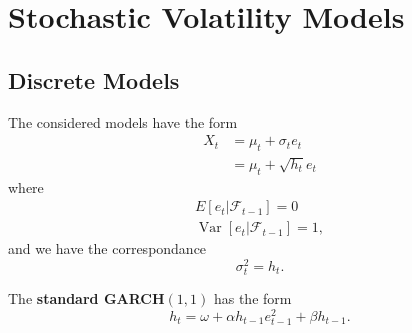 \documentclass[10pt]{article}
\newcommand{\filtr}{\mathscr{F}}
\DeclareMathOperator{\Var}{Var}
\begin{document}
\section{Stochastic Volatility Models}

\subsection{Discrete Models}
\begin{outline}
  \1 The considered models have the form
  \begin{align*}
    X_t &= \mu_t + \sigma_te_t\\
        &= \mu_t + \sqrt{h_t}e_t
  \end{align*}
  where 
  \begin{gather*}
    E[e_t|\filtr_{t-1}]=0\\
    \Var[e_t|\filtr_{t-1}] = 1,
  \end{gather*}
  and we have the correspondance
  \begin{equation*}
    \sigma^2_t = h_t.
  \end{equation*}

  \1 The \textbf{standard GARCH$(1,1)$} has the form
  \begin{equation*}
    h_t = \omega + \alpha h_{t-1}e^2_{t-1} + \beta h_{t-1}.
  \end{equation*}
\end{outline}
\end{document}
